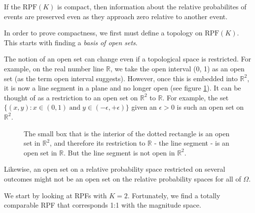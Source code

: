\documentclass[twoside]{article}
\theoremstyle{plain}%
\theoremstyle{definition}
\theoremstyle{remark}
\begin{document}
If the \(\text{RPF}(K)\) is compact, then information about the relative probabilites of events are preserved even as they approach zero relative to another event.

In order to prove compactness, we first must define a topology on \(\text{RPF}(K)\). This starts with finding a \textit{basis of open sets}.

The notion of an open set can change even if a topological space is restricted. For example, on the real number line \(\mathbb{R}\), we take the open interval (0, 1) as an open set (as the term open interval suggests). However, once this is embedded into \(\mathbb{R}^2\), it is now a line segment in a plane and no longer open (see figure \ref{fig:sub_topology}). It can be thought of as a restriction to an open set on \(\mathbb{R}^2\) to \(\mathbb{R}\). For example, the set \(\{(x, y): x \in (0, 1)\;  \text{and}\;  y \in (-\epsilon, +\epsilon)\}\) given an \(\epsilon > 0\) is such an open set on \(\mathbb{R}^2\).

\begin{figure}[h]
\centering
{}
\caption{The small box that is the interior of the dotted rectangle is an open set in \(\mathbb{R}^2\), and therefore its restriction to \(\mathbb{R}\) - the line segment - is an open set in \(\mathbb{R}\). But the line segment is not open in \(\mathbb{R}^2\).}
\label{fig:sub_topology}
\end{figure}


Likewise, an open set on a relative probability space restricted on several outcomes might not be an open set on the relative probability spaces for all of \(\Omega\).

We start by looking at RPFs with \(K = 2\). Fortunately, we find a totally comparable RPF that corresponds 1:1 with the magnitude space.
\end{document}
